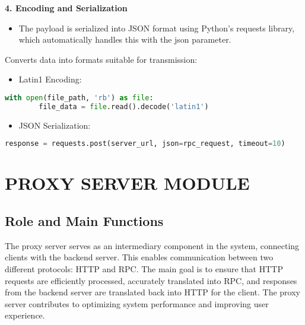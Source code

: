 \documentclass{article}
\begin{document}
\textbf{4. Encoding and Serialization}


\begin{itemize}
    \item The payload is serialized into JSON format using Python's requests library, which automatically handles this with the json parameter.
\end{itemize}
    Converts data into formats suitable for transmission:
\begin{itemize}
    \item Latin1 Encoding:
\end{itemize}
\begin{small}
\begin{lstlisting}[language=Python]
   with open(file_path, 'rb') as file:
        file_data = file.read().decode('latin1') 
\end{lstlisting}
\end{small}
\begin{itemize}
    \item JSON Serialization:
\end{itemize}
\begin{small}
\begin{lstlisting}[language=Python]
    response = requests.post(server_url, json=rpc_request, timeout=10)
\end{lstlisting}
\end{small}
\section{PROXY SERVER MODULE} %
\subsection{Role and Main Functions}
The proxy server serves as an intermediary component in the system, connecting clients with the backend server. This enables communication between two different protocols: HTTP and RPC. The main goal is to ensure that HTTP requests are efficiently processed, accurately translated into RPC, and responses from the backend server are translated back into HTTP for the client. The proxy server contributes to optimizing system performance and improving user experience.
\end{document}
